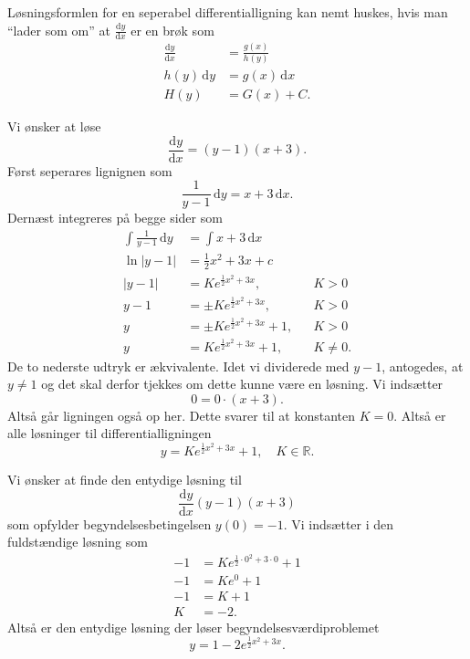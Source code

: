 Løsningsformlen for en seperabel differentialligning kan nemt huskes, hvis man ``lader som om'' at $\frac{\mathrm{d}y}{\mathrm{d}x}$ er en brøk som
\begin{align*}
\frac{\mathrm{d}y}{\mathrm{d}x} &= \frac{g(x)}{h(y)} \\
h(y) \, \mathrm{d}y &= g(x) \, \mathrm{d}x  \\
H(y) &= G(x) + C
.\end{align*}

\begin{eks} 
  Vi ønsker at løse
  \[ 
  \frac{\mathrm{d}y}{\mathrm{d}x} = (y-1)(x+3)
  .\]
  \bigbreak
  Først seperares lignignen som
  \[ 
  \frac{1}{y-1} \, \mathrm{d}y = x+3 \, \mathrm{d}x 
  .\]
  Dernæst integreres på begge sider som
  \begin{align*}
  \int \frac{1}{y-1} \, \mathrm{d}y &= \int  x+3 \, \mathrm{d}x  \\
  \ln|y-1| &= \frac{1}{2}x^2 + 3x + c \\
  |y-1| &= Ke^{\frac{1}{2}x^2 + 3x},& &K >0 \\
  y-1 &= \pm Ke^{\frac{1}{2}x^2 + 3x},& &K > 0 \\
  y &= \pm Ke^{\frac{1}{2}x^2 + 3x} + 1,& &K>0 \\
  y &= Ke^{\frac{1}{2}x^2 + 3x } +1,& &K \neq 0
  .\end{align*}
  De to nederste udtryk er ækvivalente. Idet vi dividerede med $y-1$, antogedes, at $y \neq 1$ og det skal derfor tjekkes om dette kunne være en løsning. Vi indsætter
  \[ 
  0 = 0 \cdot (x+3)
  .\]
  Altså går ligningen også op her. Dette svarer til at konstanten $K = 0$. Altså er alle løsninger til differentialligningen
  \[ 
  y = Ke^{\frac{1}{2}x^2 + 3x} + 1, \quad K \in \mathbb{R}
  .\]
\end{eks}

\begin{eks} 
  Vi ønsker at finde den entydige løsning til
  \[ 
  \frac{\mathrm{d}y}{\mathrm{d}x} (y-1)(x+3)
  \]
  som opfylder begyndelsesbetingelsen $y(0) = -1$.
  \bigbreak
  Vi indsætter i den fuldstændige løsning som
  \begin{align*}
  -1 &= K e^{\frac{1}{2} \cdot 0^2 + 3\cdot 0} + 1 \\
  -1 &= K e^{0} + 1 \\
  -1 &= K + 1 \\
  K &= -2
  .\end{align*}
  Altså er den entydige løsning der løser begyndelsesværdiproblemet
  \[ 
  y = 1 - 2e^{\frac{1}{2}x^2 + 3x}
  .\]
\end{eks}

